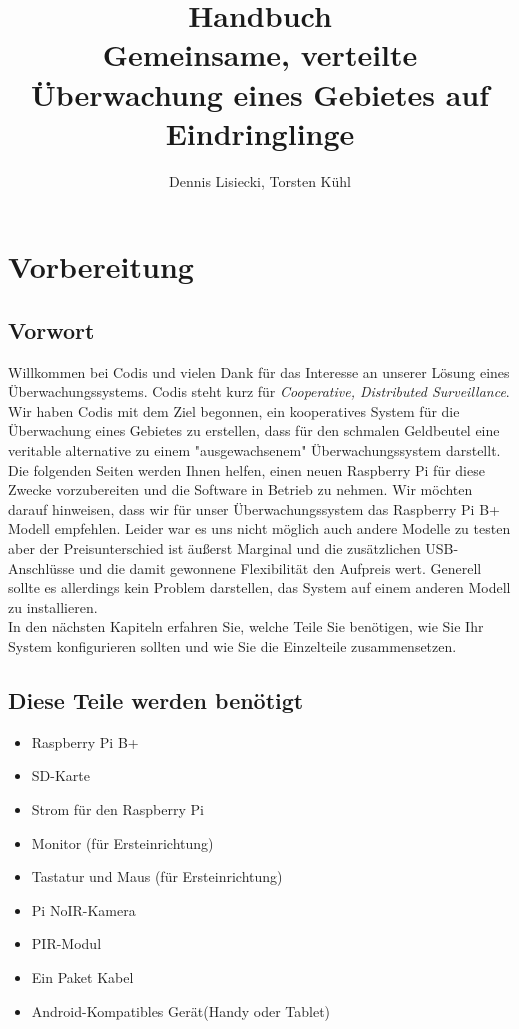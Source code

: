 \documentclass[12pt,a4paper]{scrreprt}
\title{Handbuch \\ Gemeinsame, verteilte Überwachung eines Gebietes auf Eindringlinge}
\author{Dennis Lisiecki, Torsten Kühl}
\begin{document}
\maketitle	%
\tableofcontents	%


\chapter{Vorbereitung}
\section{Vorwort}
Willkommen bei Codis und vielen Dank für das Interesse an unserer Lösung eines Überwachungssystems. Codis steht kurz für \textit{Cooperative, Distributed Surveillance}. Wir haben Codis mit dem Ziel begonnen, ein kooperatives System für die Überwachung eines Gebietes zu erstellen, dass für den schmalen Geldbeutel eine veritable alternative zu einem "ausgewachsenem" Überwachungssystem darstellt. Die folgenden Seiten werden Ihnen helfen, einen neuen Raspberry Pi für diese Zwecke vorzubereiten und die Software in Betrieb zu nehmen. Wir möchten darauf hinweisen, dass wir für unser Überwachungssystem das Raspberry Pi B+ Modell empfehlen. Leider war es uns nicht möglich auch andere Modelle zu testen aber der Preisunterschied ist äußerst Marginal und die zusätzlichen USB-Anschlüsse und die damit gewonnene Flexibilität den Aufpreis wert. Generell sollte es allerdings kein Problem darstellen, das System auf einem anderen Modell zu installieren. \\In den nächsten Kapiteln erfahren Sie, welche Teile Sie benötigen, wie Sie Ihr System konfigurieren sollten und wie Sie die Einzelteile zusammensetzen. 

\section{Diese Teile werden benötigt}
\begin{itemize}
\item Raspberry Pi B+
\item SD-Karte
\item Strom für den Raspberry Pi
\item Monitor (für Ersteinrichtung)
\item Tastatur und Maus (für Ersteinrichtung) 
\item Pi NoIR-Kamera
\item PIR-Modul
\item Ein Paket Kabel
\item Android-Kompatibles Gerät(Handy oder Tablet)
\end{itemize}
\end{document}
